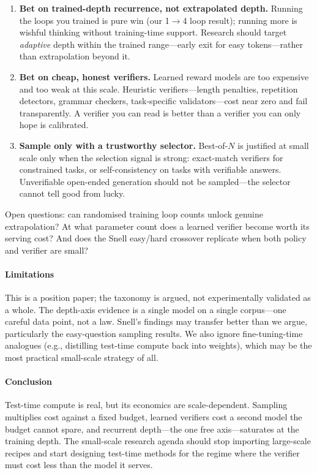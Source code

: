 \begin{enumerate}
\item \textbf{Bet on trained-depth recurrence, not extrapolated depth.}
Running the loops you trained is pure win (our 1$\rightarrow$4 loop
result); running more is wishful thinking without training-time
support. Research should target \emph{adaptive} depth within the
trained range---early exit for easy tokens---rather than extrapolation
beyond it.

\item \textbf{Bet on cheap, honest verifiers.} Learned reward models are
too expensive and too weak at this scale. Heuristic verifiers---length
penalties, repetition detectors, grammar checkers, task-specific
validators---cost near zero and fail transparently. A verifier you can
read is better than a verifier you can only hope is calibrated.

\item \textbf{Sample only with a trustworthy selector.} Best-of-$N$ is
justified at small scale only when the selection signal is strong:
exact-match verifiers for constrained tasks, or self-consistency on
tasks with verifiable answers. Unverifiable open-ended generation
should not be sampled---the selector cannot tell good from lucky.
\end{enumerate}

Open questions: can randomised training loop counts unlock genuine
extrapolation? At what parameter count does a learned verifier become
worth its serving cost? And does the Snell easy/hard crossover replicate
when both policy and verifier are small?

\paragraph{Limitations}

This is a position paper; the taxonomy is argued, not experimentally
validated as a whole. The depth-axis evidence is a single model on a
single corpus---one careful data point, not a law. Snell's findings may
transfer better than we argue, particularly the easy-question sampling
results. We also ignore fine-tuning-time analogues (e.g., distilling
test-time compute back into weights), which may be the most practical
small-scale strategy of all.

\paragraph{Conclusion}

Test-time compute is real, but its economics are scale-dependent.
Sampling multiplies cost against a fixed budget, learned verifiers cost
a second model the budget cannot spare, and recurrent depth---the one
free axis---saturates at the training depth. The small-scale research
agenda should stop importing large-scale recipes and start designing
test-time methods for the regime where the verifier must cost less than
the model it serves.
